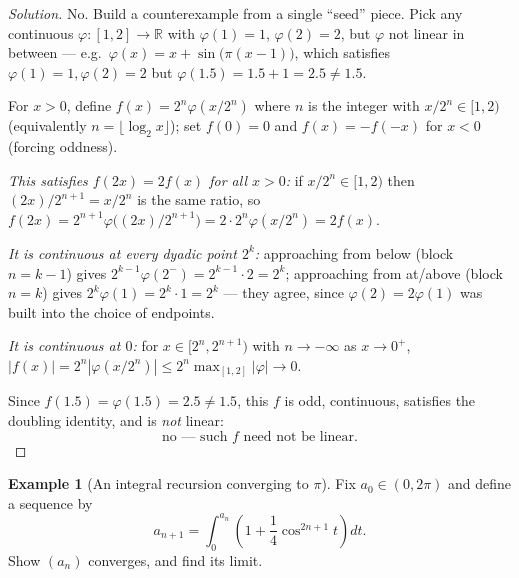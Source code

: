 \documentclass[11pt]{article}
\theoremstyle{definition}
\newtheorem{example}{Example}[section]
\newcommand{\R}{\mathbb{R}}
\begin{document}
\begin{proof}[Solution]
No. Build a counterexample from a single ``seed'' piece. Pick any continuous $\varphi:[1,2]\to\R$ with $\varphi(1)=1$, $\varphi(2)=2$, but $\varphi$ not linear in between — e.g.\ $\varphi(x)=x+\sin\big(\pi(x-1)\big)$, which satisfies $\varphi(1)=1,\varphi(2)=2$ but $\varphi(1.5)=1.5+1=2.5\neq1.5$.

For $x>0$, define $f(x)=2^n\varphi(x/2^n)$ where $n$ is the integer with $x/2^n\in[1,2)$ (equivalently $n=\lfloor\log_2x\rfloor$); set $f(0)=0$ and $f(x)=-f(-x)$ for $x<0$ (forcing oddness).

\emph{This satisfies $f(2x)=2f(x)$ for all $x>0$:} if $x/2^n\in[1,2)$ then $(2x)/2^{n+1}=x/2^n$ is the same ratio, so $f(2x)=2^{n+1}\varphi\big((2x)/2^{n+1}\big)=2\cdot2^n\varphi(x/2^n)=2f(x)$.

\emph{It is continuous at every dyadic point $2^k$:} approaching from below (block $n=k-1$) gives $2^{k-1}\varphi(2^-)=2^{k-1}\cdot2=2^k$; approaching from at/above (block $n=k$) gives $2^k\varphi(1)=2^k\cdot1=2^k$ — they agree, since $\varphi(2)=2\varphi(1)$ was built into the choice of endpoints.

\emph{It is continuous at $0$:} for $x\in[2^n,2^{n+1})$ with $n\to-\infty$ as $x\to0^+$, $|f(x)|=2^n|\varphi(x/2^n)|\le 2^n\max_{[1,2]}|\varphi|\to0$.

Since $f(1.5)=\varphi(1.5)=2.5\ne1.5$, this $f$ is odd, continuous, satisfies the doubling identity, and is \emph{not} linear:
\[
\boxed{\text{no — such } f \text{ need not be linear}}.
\]
\end{proof}

\begin{example}[An integral recursion converging to $\pi$]
Fix $a_0\in(0,2\pi)$ and define a sequence by
\[
a_{n+1}=\int_0^{a_n}\left(1+\frac14\cos^{2n+1}t\right)dt.
\]
Show $(a_n)$ converges, and find its limit.
\end{example}
\end{document}
